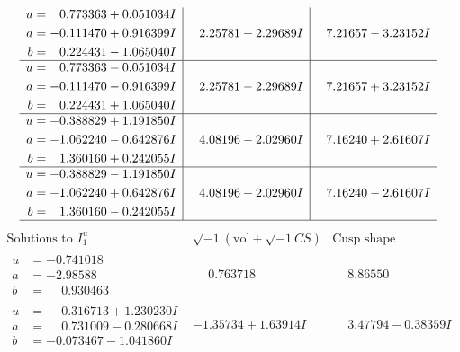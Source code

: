 \documentclass[1p]{elsarticle_modified}
\theoremstyle{definition}
\newcommand{\I}{\sqrt{-1}}
\begin{document}
$$\begin{array}{c|c|c}
\begin{aligned}
u &= \phantom{-}0.773363 + 0.051034 I \\
a &= -0.111470 + 0.916399 I \\
b &= \phantom{-}0.224431 - 1.065040 I\end{aligned}
 & \phantom{-}2.25781 + 2.29689 I & \phantom{-}7.21657 - 3.23152 I \\ \hline\begin{aligned}
u &= \phantom{-}0.773363 - 0.051034 I \\
a &= -0.111470 - 0.916399 I \\
b &= \phantom{-}0.224431 + 1.065040 I\end{aligned}
 & \phantom{-}2.25781 - 2.29689 I & \phantom{-}7.21657 + 3.23152 I \\ \hline\begin{aligned}
u &= -0.388829 + 1.191850 I \\
a &= -1.062240 - 0.642876 I \\
b &= \phantom{-}1.360160 + 0.242055 I\end{aligned}
 & \phantom{-}4.08196 - 2.02960 I & \phantom{-}7.16240 + 2.61607 I \\ \hline\begin{aligned}
u &= -0.388829 - 1.191850 I \\
a &= -1.062240 + 0.642876 I \\
b &= \phantom{-}1.360160 - 0.242055 I\end{aligned}
 & \phantom{-}4.08196 + 2.02960 I & \phantom{-}7.16240 - 2.61607 I\\
 \hline 
 \end{array}$$\newpage$$\begin{array}{c|c|c}  
\text{Solutions to }I^u_{1}& \I (\text{vol} + \sqrt{-1}CS) & \text{Cusp shape}\\
 \hline 
\begin{aligned}
u &= -0.741018\phantom{ +0.000000I} \\
a &= -2.98588\phantom{ +0.000000I} \\
b &= \phantom{-}0.930463\phantom{ +0.000000I}\end{aligned}
 & \phantom{-}0.763718\phantom{ +0.000000I} & \phantom{-}8.86550\phantom{ +0.000000I} \\ \hline\begin{aligned}
u &= \phantom{-}0.316713 + 1.230230 I \\
a &= \phantom{-}0.731009 - 0.280668 I \\
b &= -0.073467 - 1.041860 I\end{aligned}
 & -1.35734 + 1.63914 I & \phantom{-}3.47794 - 0.38359 I \\ \hline\begin{aligned}

\end{aligned}
\end{array}$$
\end{document}
